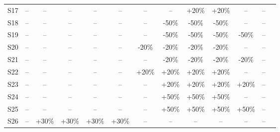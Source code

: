 \documentclass[11pt]{article}
\begin{document}
\begin{table}[htbp]
{\begin{tabular}{lcccccccccccc}
S17 & --    & --    & --    & --    & --    & --    & --    & +20\% & +20\% & --    & -- \\
S18 & --    & --    & --    & --    & --    & --    & -50\% & -50\% & -50\% & --    & -- \\
S19 & --    & --    & --    & --    & --    & --    & -50\% & -50\% & -50\% & -50\% & -- \\
S20 & --    & --    & --    & --    & --    & -20\% & -20\% & -20\% & -20\% & --    & -- \\
S21 & --    & --    & --    & --    & --    & --    & -20\% & -20\% & -20\% & -20\% & -- \\
S22 & --    & --    & --    & --    & --    & +20\% & +20\% & +20\% & +20\% & --    & -- \\
S23 & --    & --    & --    & --    & --    & --    & +20\% & +20\% & +20\% & +20\% & -- \\
S24 & --    & --    & --    & --    & --    & --    & +50\% & +50\% & +50\% & --    & -- \\
S25 & --    & --    & --    & --    & --    & --    & +50\% & +50\% & +50\% & +50\% & -- \\
S26 & --    & +30\% & +30\% & +30\% & +30\% & --    & --    & --    & --    & --    & -- \\
\bottomrule
\end{tabular}
}
\end{table}
\end{document}
